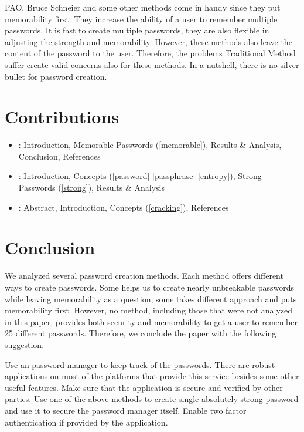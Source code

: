 \documentclass[acmsmall,nonacm]{acmart}
\begin{document}
PAO, Bruce Schneier and some other methods come in handy since they put memorability first. They increase the ability of a user to remember multiple passwords. It is fast to create multiple passwords, they are also flexible in adjusting the strength and memorability. However, these methods also leave the content of the password to the user. Therefore, the problems Traditional Method suffer create valid concerns also for these methods. In a nutshell, there is no silver bullet for password creation.

\newpage

\section{Contributions}
\begin{itemize}
\item{: Introduction, Memorable Passwords (\ref{memorable}), Results \& Analysis, Conclusion, References}
\item{: Introduction, Concepts (\ref{password} \ref{passphrase}  \ref{entropy}), Strong Passwords (\ref{strong}), Results \& Analysis}
\item{: Abstract, Introduction, Concepts (\ref{cracking}),  References}
\end{itemize}

\section{Conclusion}

We analyzed several password creation methods. Each method offers different ways to create passwords. Some helps us to create nearly unbreakable passwords while leaving memorability as a question, some takes different approach and puts memorability first. However, no method, including those that were not analyzed in this paper, provides both security and memorability to get a user to remember 25 different passwords. Therefore, we conclude the paper with the following suggestion.

Use an password manager to keep track of the passwords. There are robust applications on most of the platforms that provide this service besides some other useful features. Make sure that the application is secure and verified by other parties. Use one of the above methods to create single absolutely strong password and use it to secure the password manager itself. Enable two factor authentication if provided by the application.




\appendix
\end{document}
